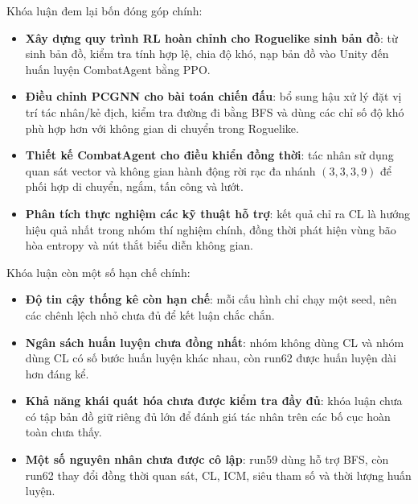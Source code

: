 \vspace{0.5cm}

Khóa luận đem lại bốn đóng góp chính:

\renewcommand{\labelitemi}{$-$}
\begin{itemize}
    \item \textbf{Xây dựng quy trình RL hoàn chỉnh cho Roguelike sinh bản đồ}: từ sinh bản đồ, kiểm tra tính hợp lệ, chia độ khó, nạp bản đồ vào Unity đến huấn luyện CombatAgent bằng PPO.

    \item \textbf{Điều chỉnh PCGNN cho bài toán chiến đấu}: bổ sung hậu xử lý đặt vị trí tác nhân/kẻ địch, kiểm tra đường đi bằng BFS và dùng các chỉ số độ khó phù hợp hơn với không gian di chuyển trong Roguelike.

    \item \textbf{Thiết kế CombatAgent cho điều khiển đồng thời}: tác nhân sử dụng quan sát vector và không gian hành động rời rạc đa nhánh $(3,3,3,9)$ để phối hợp di chuyển, ngắm, tấn công và lướt.

    \item \textbf{Phân tích thực nghiệm các kỹ thuật hỗ trợ}: kết quả chỉ ra CL là hướng hiệu quả nhất trong nhóm thí nghiệm chính, đồng thời phát hiện vùng bão hòa entropy và nút thắt biểu diễn không gian.
\end{itemize}

\vspace{0.5cm}

Khóa luận còn một số hạn chế chính:

\renewcommand{\labelitemi}{$-$}
\begin{itemize}
    \item \textbf{Độ tin cậy thống kê còn hạn chế}: mỗi cấu hình chỉ chạy một seed, nên các chênh lệch nhỏ chưa đủ để kết luận chắc chắn.

    \item \textbf{Ngân sách huấn luyện chưa đồng nhất}: nhóm không dùng CL và nhóm dùng CL có số bước huấn luyện khác nhau, còn run62 được huấn luyện dài hơn đáng kể.

    \item \textbf{Khả năng khái quát hóa chưa được kiểm tra đầy đủ}: khóa luận chưa có tập bản đồ giữ riêng đủ lớn để đánh giá tác nhân trên các bố cục hoàn toàn chưa thấy.

    \item \textbf{Một số nguyên nhân chưa được cô lập}: run59 dùng hỗ trợ BFS, còn run62 thay đổi đồng thời quan sát, CL, ICM, siêu tham số và thời lượng huấn luyện.
\end{itemize}

